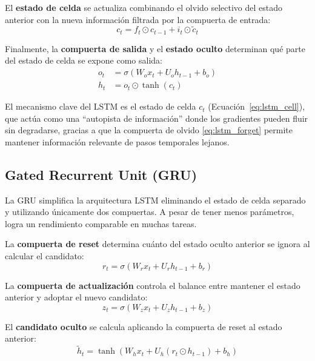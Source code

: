 El \textbf{estado de celda} se actualiza combinando el olvido selectivo del estado anterior con la nueva información filtrada por la compuerta de entrada:
\begin{equation}
    c_t = f_t \odot c_{t-1} + i_t \odot \tilde{c}_t
    \label{eq:lstm_cell}
\end{equation}

Finalmente, la \textbf{compuerta de salida} y el \textbf{estado oculto} determinan qué parte del estado de celda se expone como salida:
\begin{equation}
    \begin{aligned}
        o_t &= \sigma(W_o x_t + U_o h_{t-1} + b_o) \\
        h_t &= o_t \odot \tanh(c_t)
    \end{aligned}
    \label{eq:lstm_output}
\end{equation}

El mecanismo clave del LSTM es el estado de celda $c_t$ (Ecuación~\eqref{eq:lstm_cell}), que actúa como una ``autopista de información'' donde los gradientes pueden fluir sin degradarse, gracias a que la compuerta de olvido \eqref{eq:lstm_forget} permite mantener información relevante de pasos temporales lejanos.

\subsection{Gated Recurrent Unit (GRU)}

La GRU \cite{cho2014} simplifica la arquitectura LSTM eliminando el estado de celda separado y utilizando únicamente dos compuertas. A pesar de tener menos parámetros, logra un rendimiento comparable en muchas tareas.

La \textbf{compuerta de reset} determina cuánto del estado oculto anterior se ignora al calcular el candidato:
\begin{equation}
    r_t = \sigma(W_r x_t + U_r h_{t-1} + b_r)
    \label{eq:gru_reset}
\end{equation}

La \textbf{compuerta de actualización} controla el balance entre mantener el estado anterior y adoptar el nuevo candidato:
\begin{equation}
    z_t = \sigma(W_z x_t + U_z h_{t-1} + b_z)
    \label{eq:gru_update}
\end{equation}

El \textbf{candidato oculto} se calcula aplicando la compuerta de reset al estado anterior:
\begin{equation}
    \tilde{h}_t = \tanh(W_h x_t + U_h (r_t \odot h_{t-1}) + b_h)
    \label{eq:gru_candidate}
\end{equation}

